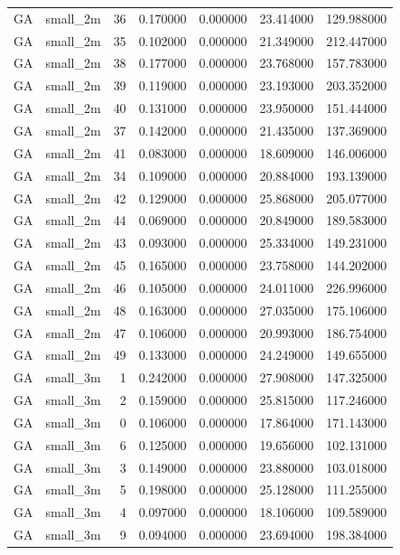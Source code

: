 \begin{tabular}{llrrrrr}
GA & small_2m & 36 & 0.170000 & 0.000000 & 23.414000 & 129.988000 \\
GA & small_2m & 35 & 0.102000 & 0.000000 & 21.349000 & 212.447000 \\
GA & small_2m & 38 & 0.177000 & 0.000000 & 23.768000 & 157.783000 \\
GA & small_2m & 39 & 0.119000 & 0.000000 & 23.193000 & 203.352000 \\
GA & small_2m & 40 & 0.131000 & 0.000000 & 23.950000 & 151.444000 \\
GA & small_2m & 37 & 0.142000 & 0.000000 & 21.435000 & 137.369000 \\
GA & small_2m & 41 & 0.083000 & 0.000000 & 18.609000 & 146.006000 \\
GA & small_2m & 34 & 0.109000 & 0.000000 & 20.884000 & 193.139000 \\
GA & small_2m & 42 & 0.129000 & 0.000000 & 25.868000 & 205.077000 \\
GA & small_2m & 44 & 0.069000 & 0.000000 & 20.849000 & 189.583000 \\
GA & small_2m & 43 & 0.093000 & 0.000000 & 25.334000 & 149.231000 \\
GA & small_2m & 45 & 0.165000 & 0.000000 & 23.758000 & 144.202000 \\
GA & small_2m & 46 & 0.105000 & 0.000000 & 24.011000 & 226.996000 \\
GA & small_2m & 48 & 0.163000 & 0.000000 & 27.035000 & 175.106000 \\
GA & small_2m & 47 & 0.106000 & 0.000000 & 20.993000 & 186.754000 \\
GA & small_2m & 49 & 0.133000 & 0.000000 & 24.249000 & 149.655000 \\
GA & small_3m & 1 & 0.242000 & 0.000000 & 27.908000 & 147.325000 \\
GA & small_3m & 2 & 0.159000 & 0.000000 & 25.815000 & 117.246000 \\
GA & small_3m & 0 & 0.106000 & 0.000000 & 17.864000 & 171.143000 \\
GA & small_3m & 6 & 0.125000 & 0.000000 & 19.656000 & 102.131000 \\
GA & small_3m & 3 & 0.149000 & 0.000000 & 23.880000 & 103.018000 \\
GA & small_3m & 5 & 0.198000 & 0.000000 & 25.128000 & 111.255000 \\
GA & small_3m & 4 & 0.097000 & 0.000000 & 18.106000 & 109.589000 \\
GA & small_3m & 9 & 0.094000 & 0.000000 & 23.694000 & 198.384000 \\

\end{tabular}
